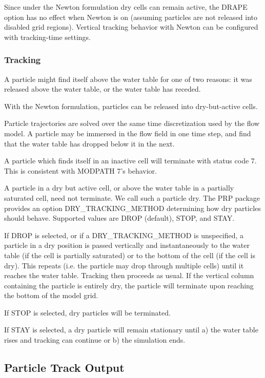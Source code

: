 Since under the Newton formulation dry cells can remain active, the DRAPE option has no effect when Newton is on (assuming particles are not released into disabled grid regions). Vertical tracking behavior with Newton can be configured with tracking-time settings.

\subsubsection{Tracking}

A particle might find itself above the water table for one of two reasons: it was released above the water table, or the water table has receded.

With the Newton formulation, particles can be released into dry-but-active cells.

Particle trajectories are solved over the same time discretization used by the flow model. A particle may be immersed in the flow field in one time step, and find that the water table has dropped below it in the next.

A particle which finds itself in an inactive cell will terminate with status code 7. This is consistent with MODPATH 7's behavior.

A particle in a dry but active cell, or above the water table in a partially saturated cell, need not terminate. We call such a particle dry. The PRP package provides an option DRY\_TRACKING\_METHOD determining how dry particles should behave. Supported values are DROP (default), STOP, and STAY.

If DROP is selected, or if a DRY\_TRACKING\_METHOD is unspecified, a particle in a dry position is passed vertically and instantaneously to the water table (if the cell is partially saturated) or to the bottom of the cell (if the cell is dry). This repeats (i.e. the particle may drop through multiple cells) until it reaches the water table. Tracking then proceeds as usual. If the vertical column containing the particle is entirely dry, the particle will terminate upon reaching the bottom of the model grid.

If STOP is selected, dry particles will be terminated.

If STAY is selected, a dry particle will remain stationary until a) the water table rises and tracking can continue or b) the simulation ends.

\subsection{Particle Track Output}

